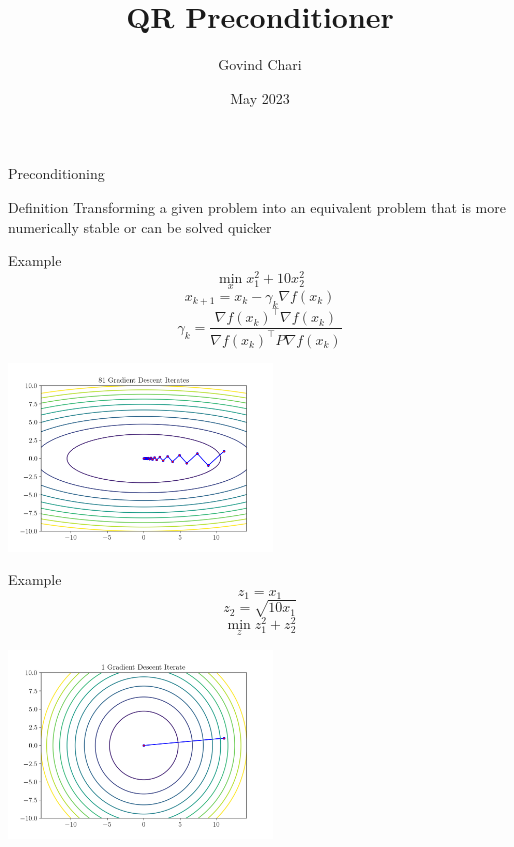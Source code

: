 \documentclass{beamer}
\title{QR Preconditioner}
\author{Govind Chari}
\date{May 2023}
\institute{Univeristy of Washington}
\begin{document}
\begin{frame}
    \titlepage
\end{frame}

\logo{}

\begin{frame}{Preconditioning}
    \begin{block}{Definition}
        Transforming a given problem into an equivalent problem that is more numerically stable or can be solved quicker
    \end{block}  
\end{frame}

\begin{frame}{Example}
    $$\min_{x} x_1^2 + 10x_2^2$$
    $$x_{k+1} = x_k - \gamma_k \nabla f(x_k)$$
    $$\gamma_k = \frac{\nabla f(x_k)^\top \nabla f(x_k)}{\nabla f(x_k)^\top P \nabla f(x_k)}$$
    \begin{center}
        \includegraphics[width=7cm]{img/ill_conditioned.png}
    \end{center}
\end{frame}

\begin{frame}{Example}
    $$z_1 = x_1$$
    $$z_2 = \sqrt{10x_1}$$
    $$\min_{z} z_1^2 + z_2^2$$

    \begin{center}
        \includegraphics[width=7cm]{img/well_conditioned.png}
    \end{center}
\end{frame}
\end{document}
